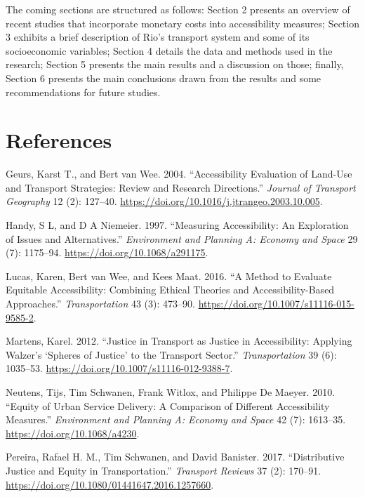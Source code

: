 \documentclass[msc,numbers]{coppe}
\begin{document}
  The coming sections are structured as follows: Section 2 presents an overview of recent studies that incorporate monetary costs into accessibility measures; Section 3 exhibits a brief description of Rio's transport system and some of its socioeconomic variables; Section 4 details the data and methods used in the research; Section 5 presents the main results and a discussion on those; finally, Section 6 presents the main conclusions drawn from the results and some recommendations for future studies.

  \hypertarget{references}{%
  \chapter*{References}\label{references}}

  
  

  \hypertarget{refs}{}
  \begin{CSLReferences}{1}{0}
  \leavevmode\hypertarget{ref-geurs2004accessibility}{}%
  Geurs, Karst T., and Bert van Wee. 2004. {``Accessibility Evaluation of Land-Use and Transport Strategies: Review and Research Directions.''} \emph{Journal of Transport Geography} 12 (2): 127--40. \url{https://doi.org/10.1016/j.jtrangeo.2003.10.005}.

  \leavevmode\hypertarget{ref-handy1997measuring}{}%
  Handy, S L, and D A Niemeier. 1997. {``Measuring {Accessibility}: {An Exploration} of {Issues} and {Alternatives}.''} \emph{Environment and Planning A: Economy and Space} 29 (7): 1175--94. \url{https://doi.org/10.1068/a291175}.

  \leavevmode\hypertarget{ref-lucas2016method}{}%
  Lucas, Karen, Bert van Wee, and Kees Maat. 2016. {``A Method to Evaluate Equitable Accessibility: Combining Ethical Theories and Accessibility-Based Approaches.''} \emph{Transportation} 43 (3): 473--90. \url{https://doi.org/10.1007/s11116-015-9585-2}.

  \leavevmode\hypertarget{ref-martens2012justice}{}%
  Martens, Karel. 2012. {``Justice in Transport as Justice in Accessibility: Applying {Walzer}'s {`{Spheres} of {Justice}'} to the Transport Sector.''} \emph{Transportation} 39 (6): 1035--53. \url{https://doi.org/10.1007/s11116-012-9388-7}.

  \leavevmode\hypertarget{ref-neutens2010equity}{}%
  Neutens, Tijs, Tim Schwanen, Frank Witlox, and Philippe De Maeyer. 2010. {``Equity of {Urban Service Delivery}: {A Comparison} of {Different Accessibility Measures}.''} \emph{Environment and Planning A: Economy and Space} 42 (7): 1613--35. \url{https://doi.org/10.1068/a4230}.

  \leavevmode\hypertarget{ref-pereira2017distributive}{}%
  Pereira, Rafael H. M., Tim Schwanen, and David Banister. 2017. {``Distributive Justice and Equity in Transportation.''} \emph{Transport Reviews} 37 (2): 170--91. \url{https://doi.org/10.1080/01441647.2016.1257660}.

  \end{CSLReferences}
\end{document}
